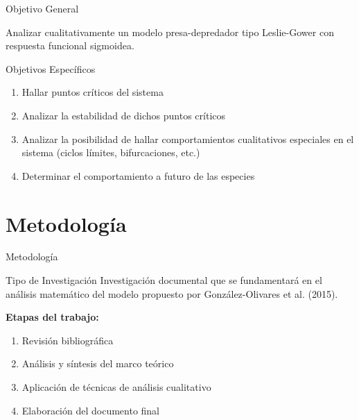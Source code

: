 \documentclass[aspectratio=169]{beamer}
\theoremstyle{definition}
\begin{document}
	\begin{frame}{Objetivo General}
		\begin{block}{}
			\centering
			\large
			Analizar cualitativamente un modelo presa-depredador tipo Leslie-Gower con respuesta funcional sigmoidea.
		\end{block}
	\end{frame}
	
	\begin{frame}{Objetivos Específicos}
		\begin{enumerate}
			\item Hallar puntos críticos del sistema
			\vspace{0.3cm}
			\item Analizar la estabilidad de dichos puntos críticos
			\vspace{0.3cm}
			\item Analizar la posibilidad de hallar comportamientos cualitativos especiales en el sistema (ciclos límites, bifurcaciones, etc.)
			\vspace{0.3cm}
			\item Determinar el comportamiento a futuro de las especies
		\end{enumerate}
	\end{frame}
	
	\section{Metodología}
	
	\begin{frame}{Metodología}
		\begin{block}{Tipo de Investigación}
			Investigación documental que se fundamentará en el análisis matemático del modelo propuesto por González-Olivares et al. (2015).
		\end{block}
		
		\vspace{0.5cm}
		
		\textbf{Etapas del trabajo:}
		\begin{enumerate}
			\item Revisión bibliográfica
			\item Análisis y síntesis del marco teórico
			\item Aplicación de técnicas de análisis cualitativo
			\item Elaboración del documento final
		\end{enumerate}
	\end{frame}
	
\end{document}
